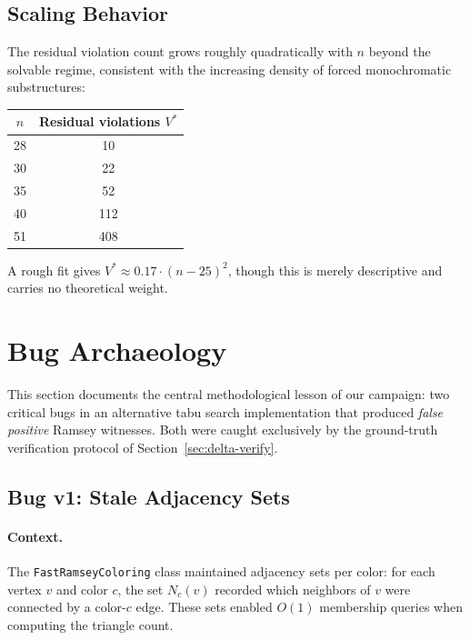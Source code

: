 \documentclass[11pt,a4paper]{article}
\theoremstyle{definition}
\theoremstyle{remark}
\begin{document}
\subsection{Scaling Behavior}

The residual violation count grows roughly quadratically with $n$
beyond the solvable regime, consistent with the increasing density of
forced monochromatic substructures:
\begin{center}
\begin{tabular}{@{}cc@{}}
\toprule
$n$ & Residual violations $V^*$ \\
\midrule
28 & 10 \\
30 & 22 \\
35 & 52 \\
40 & 112 \\
51 & 408 \\
\bottomrule
\end{tabular}
\end{center}

A rough fit gives $V^* \approx 0.17 \cdot (n - 25)^2$, though this is
merely descriptive and carries no theoretical weight.


\section{Bug Archaeology}\label{sec:bugs}

This section documents the central methodological lesson of our
campaign: two critical bugs in an alternative tabu search implementation
that produced \emph{false positive} Ramsey witnesses.
Both were caught exclusively by the ground-truth verification protocol
of Section~\ref{sec:delta-verify}.

\subsection{Bug v1: Stale Adjacency Sets}\label{sec:bug1}

\paragraph{Context.}
The \texttt{FastRamseyColoring} class maintained adjacency sets per
color: for each vertex $v$ and color $c$, the set $N_c(v)$ recorded
which neighbors of $v$ were connected by a color-$c$ edge.
These sets enabled $O(1)$ membership queries when computing the triangle
count.
\end{document}
